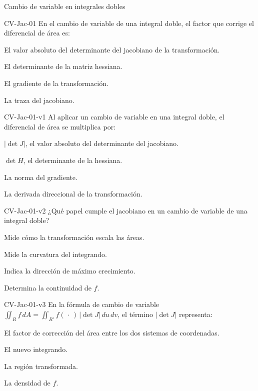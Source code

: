 \documentclass[a4,11pt]{aleph-notas}
\begin{document}
\begin{quiz}{Cambio de variable en integrales dobles}

\begin{multi}[]%
    {CV-Jac-01}
    En el cambio de variable de una integral doble, el factor que corrige el diferencial de área es:
    \item* El valor absoluto del determinante del jacobiano de la transformación.
    \item El determinante de la matriz hessiana.
    \item El gradiente de la transformación.
    \item La traza del jacobiano.
\end{multi}

\begin{multi}[]%
    {CV-Jac-01-v1}
    Al aplicar un cambio de variable en una integral doble, el diferencial de área se multiplica por:
    \item* $\left|\det J\right|$, el valor absoluto del determinante del jacobiano.
    \item $\det H$, el determinante de la hessiana.
    \item La norma del gradiente.
    \item La derivada direccional de la transformación.
\end{multi}

\begin{multi}[]%
    {CV-Jac-01-v2}
    ¿Qué papel cumple el jacobiano en un cambio de variable de una integral doble?
    \item* Mide cómo la transformación escala las áreas.
    \item Mide la curvatura del integrando.
    \item Indica la dirección de máximo crecimiento.
    \item Determina la continuidad de $f$.
\end{multi}

\begin{multi}[]%
    {CV-Jac-01-v3}
    En la fórmula de cambio de variable $\displaystyle\iint_R f\,dA = \iint_{R'} f(\,\cdot\,)\,|\det J|\,du\,dv$, el término $|\det J|$ representa:
    \item* El factor de corrección del área entre los dos sistemas de coordenadas.
    \item El nuevo integrando.
    \item La región transformada.
    \item La densidad de $f$.
\end{multi}


\end{quiz}
\end{document}
